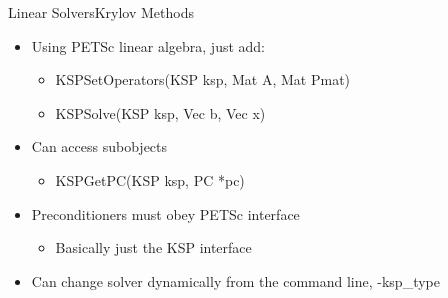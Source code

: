 \begin{frame}{Linear Solvers}{Krylov Methods}

\begin{itemize}
  \item Using PETSc linear algebra, just add:
  \begin{itemize}
    \item {\kb KSPSetOperators(KSP ksp, Mat A, Mat Pmat)}
    \item {\kb KSPSolve(KSP ksp, Vec b, Vec x)}
  \end{itemize}

  \item Can access subobjects
  \begin{itemize}
    \item {\kb KSPGetPC(KSP ksp, PC *pc)}
  \end{itemize}

  \item Preconditioners must obey PETSc interface
  \begin{itemize}
    \item Basically just the KSP interface
  \end{itemize}

  \item Can change solver dynamically from the command line, {\kb -ksp\_type}
\end{itemize}

\end{frame}
